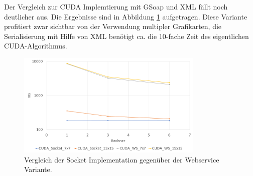 \documentclass[conference]{IEEEtran}
\begin{document}
Der Vergleich zur CUDA Implemtierung mit GSoap und XML fällt noch deutlicher aus. Die Ergebnisse sind in Abbildung \ref{fig_socket_ws} aufgetragen. Diese Variante profitiert zwar sichtbar von der Verwendung multipler Grafikarten, die Serialisierung mit Hilfe von XML benötigt ca. die 10-fache Zeit des eigentlichen CUDA-Algorithmus. 




%
%


\begin{figure}[!t]
	\centering
	\includegraphics[width=3.5in]{SocketvsWS_bunt_3.pdf} %
	\caption{Vergleich der Socket Implementation gegenüber der Webservice Variante.}
	\label{fig_socket_ws}
\end{figure}

\end{document}
